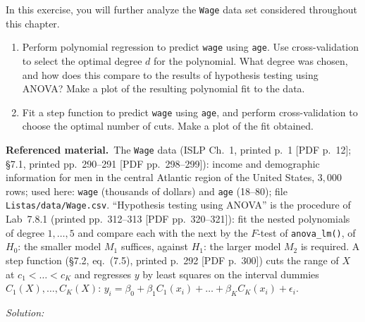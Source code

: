 \documentclass[11pt,a4paper]{article}
\newif\ifsolucoes
\newcommand{\espacoresol}{3.5cm}   %
\numberwithin{equation}{questao}   %
\newenvironment{refmat}{\par\smallskip\noindent\begin{small}\textbf{Referenced material.}\ }{\end{small}\par\smallskip}
\newcommand{\resolespaco}{\ifsolucoes\else\par\textit{Solution:}\vspace{\espacoresol}\par\fi}
\begin{document}
In this exercise, you will further analyze the \texttt{Wage} data set considered throughout this chapter.
\begin{enumerate}[label=(\alph*)]
\item Perform polynomial regression to predict \texttt{wage} using \texttt{age}. Use
cross-validation to select the optimal degree $d$ for the polynomial. What degree was chosen,
and how does this compare to the results of hypothesis testing using ANOVA? Make a plot of the
resulting polynomial fit to the data.
\item Fit a step function to predict \texttt{wage} using \texttt{age}, and perform
cross-validation to choose the optimal number of cuts. Make a plot of the fit obtained.
\end{enumerate}
\begin{refmat}The \texttt{Wage} data (ISLP Ch.~1, printed p.~1 [PDF p.~12]; §7.1, printed pp.~290--291
[PDF pp.~298--299]): income and demographic information for men in the central Atlantic region of the
United States, $3{,}000$ rows; used here: \texttt{wage} (thousands of dollars) and \texttt{age} (18--80);
file \texttt{Listas/data/Wage.csv}. ``Hypothesis testing using ANOVA'' is the procedure of Lab~7.8.1
(printed pp.~312--313 [PDF pp.~320--321]): fit the nested polynomials of degree $1,\dots,5$ and compare
each with the next by the $F$-test of \texttt{anova\_lm()}, of $H_0$: the smaller model $M_1$ suffices,
against $H_1$: the larger model $M_2$ is required. A step function (§7.2, eq.~(7.5), printed p.~292
[PDF p.~300]) cuts the range of $X$ at $c_1<\dots<c_K$ and regresses $y$ by least squares on the
interval dummies $C_1(X),\dots,C_K(X)$:
$y_i=\beta_0+\beta_1C_1(x_i)+\dots+\beta_KC_K(x_i)+\epsilon_i$.\end{refmat}
\resolespaco
\end{document}
